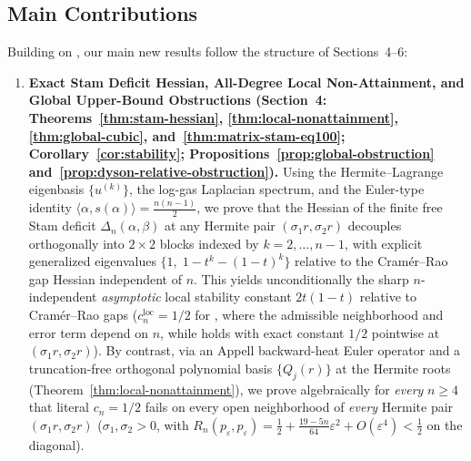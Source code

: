 \documentclass[11pt,a4paper]{article}
\theoremstyle{definition}
\begin{document}
\subsection{Main Contributions}

Building on \cite{GSS2026,Hashemi2026,HH2026}, our main new results follow the structure of Sections~4--6:

\begin{enumerate}
\item \textbf{Exact Stam Deficit Hessian, All-Degree Local Non-Attainment, and Global Upper-Bound Obstructions (Section~4: Theorems~\ref{thm:stam-hessian}, \ref{thm:local-nonattainment}, \ref{thm:global-cubic}, and~\ref{thm:matrix-stam-eq100}; Corollary~\ref{cor:stability}; Propositions~\ref{prop:global-obstruction} and~\ref{prop:dyson-relative-obstruction}).}
Using the Hermite--Lagrange eigenbasis $\{u^{(k)}\}$, the log-gas Laplacian spectrum, and the Euler-type identity $\langle \alpha, s(\alpha)\rangle = \frac{n(n-1)}{2}$, we prove that the Hessian of the finite free Stam deficit $\Delta_n(\alpha,\beta)$ at any Hermite pair $(\sigma_1 r, \sigma_2 r)$ decouples orthogonally into $2\times 2$ blocks indexed by $k = 2,\dots,n-1$, with explicit generalized eigenvalues $\{1,\; 1 - t^k - (1-t)^k\}$ relative to the Cram\'er--Rao gap Hessian independent of $n$. This yields unconditionally the sharp $n$-independent \emph{asymptotic} local stability constant $2t(1-t)$ relative to Cram\'er--Rao gaps ($c_n^{\mathrm{loc}} = 1/2$ for \cite[eq.~(101)]{HH2026}, where the admissible neighborhood and error term depend on $n$, while \cite[eq.~(100)]{HH2026} holds with exact constant $1/2$ pointwise at $(\sigma_1 r, \sigma_2 r)$). By contrast, via an Appell backward-heat Euler operator and a truncation-free orthogonal polynomial basis $\{Q_j(r)\}$ at the Hermite roots (Theorem~\ref{thm:local-nonattainment}), we prove algebraically for \emph{every} $n \ge 4$ that literal $c_n = 1/2$ fails on every open neighborhood of \emph{every} Hermite pair $(\sigma_1 r, \sigma_2 r)$ ($\sigma_1, \sigma_2 > 0$, with $R_n(p_\varepsilon, p_\varepsilon) = \frac{1}{2} + \frac{19-5n}{64}\varepsilon^2 + O(\varepsilon^4) < \frac{1}{2}$ on the diagonal).


\end{enumerate}
\end{document}

